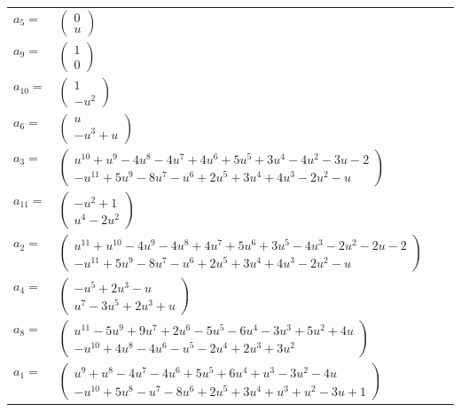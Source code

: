 \documentclass[1p]{elsarticle_modified}
\theoremstyle{definition}
\begin{document}
\begin{tabular}{m{7pt} m{180pt} m{7pt} m{180pt} }
\flushright $a_{5}=$&$\begin{pmatrix}0\\u\end{pmatrix}$ \\
\flushright $a_{9}=$&$\begin{pmatrix}1\\0\end{pmatrix}$ \\
\flushright $a_{10}=$&$\begin{pmatrix}1\\- u^2\end{pmatrix}$ \\
\flushright $a_{6}=$&$\begin{pmatrix}u\\- u^3+u\end{pmatrix}$ \\
\flushright $a_{3}=$&$\begin{pmatrix}u^{10}+u^9-4 u^8-4 u^7+4 u^6+5 u^5+3 u^4-4 u^2-3 u-2\\- u^{11}+5 u^9-8 u^7- u^6+2 u^5+3 u^4+4 u^3-2 u^2- u\end{pmatrix}$ \\
\flushright $a_{11}=$&$\begin{pmatrix}- u^2+1\\u^4-2 u^2\end{pmatrix}$ \\
\flushright $a_{2}=$&$\begin{pmatrix}u^{11}+u^{10}-4 u^9-4 u^8+4 u^7+5 u^6+3 u^5-4 u^3-2 u^2-2 u-2\\- u^{11}+5 u^9-8 u^7- u^6+2 u^5+3 u^4+4 u^3-2 u^2- u\end{pmatrix}$ \\
\flushright $a_{4}=$&$\begin{pmatrix}- u^5+2 u^3- u\\u^7-3 u^5+2 u^3+u\end{pmatrix}$ \\
\flushright $a_{8}=$&$\begin{pmatrix}u^{11}-5 u^9+9 u^7+2 u^6-5 u^5-6 u^4-3 u^3+5 u^2+4 u\\- u^{10}+4 u^8-4 u^6- u^5-2 u^4+2 u^3+3 u^2\end{pmatrix}$ \\
\flushright $a_{1}=$&$\begin{pmatrix}u^9+u^8-4 u^7-4 u^6+5 u^5+6 u^4+u^3-3 u^2-4 u\\- u^{10}+5 u^8- u^7-8 u^6+2 u^5+3 u^4+u^3+u^2-3 u+1\end{pmatrix}$ \\

\end{tabular}
\end{document}
